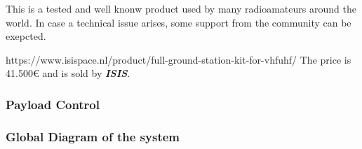 \documentclass[12pt,a4paper]{article}
\begin{document}
This is a tested and well knonw product used by many radioamateurs around the world. In case a technical issue arises, some support from the community can be exepcted.

https://www.isispace.nl/product/full-ground-station-kit-for-vhfuhf/
The price is 41.500€ and is sold by \textbf{\textit{ISIS}}.
\subsubsection{Payload Control}
\subsubsection{Global Diagram of the system}
\end{document}
